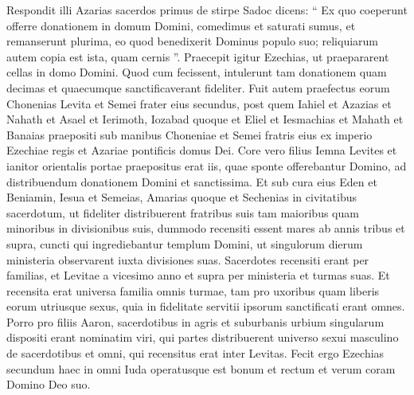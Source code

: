 \begin{biblechapter}
\begin{biblechapter}
\begin{biblechapter}
\begin{biblechapter}
\begin{biblechapter}
\begin{biblechapter}
\begin{biblechapter}
\begin{biblechapter}
\begin{biblechapter}
\begin{biblechapter}
\begin{biblechapter}
\begin{biblechapter}
\begin{biblechapter}
\begin{biblechapter}
\begin{biblechapter}
\begin{biblechapter}
\begin{biblechapter}
\begin{biblechapter}
\begin{biblechapter}
\begin{biblechapter}
\begin{biblechapter}
\begin{biblechapter}
\begin{biblechapter}
\begin{biblechapter}
\begin{biblechapter}
\begin{biblechapter}
\begin{biblechapter}
\begin{biblechapter}
\begin{biblechapter}
\begin{biblechapter}
\begin{biblechapter}
\verse Respondit illi Azarias sacerdos primus de stirpe Sadoc dicens: “ Ex quo coeperunt offerre donationem in domum Domini, comedimus et saturati sumus, et remanserunt plurima, eo quod benedixerit Dominus populo suo; reliquiarum autem copia est ista, quam cernis ”.
 \verse Praecepit igitur Ezechias, ut praepararent cellas in domo Domini. Quod cum fecissent, 
\verse intulerunt tam donationem quam decimas et quaecumque sanctificaverant fideliter. Fuit autem praefectus eorum Chonenias Levita et Semei frater eius secundus, 
\verse post quem Iahiel et Azazias et Nahath et Asael et Ierimoth, Iozabad quoque et Eliel et Iesmachias et Mahath et Banaias praepositi sub manibus Choneniae et Semei fratris eius ex imperio Ezechiae regis et Azariae pontificis domus Dei.
 \verse Core vero filius Iemna Levites et ianitor orientalis portae praepositus erat iis, quae sponte offerebantur Domino, ad distribuendum donationem Domini et sanctissima. 
\verse Et sub cura eius Eden et Beniamin, Iesua et Semeias, Amarias quoque et Sechenias in civitatibus sacerdotum, ut fideliter distribuerent fratribus suis tam maioribus quam minoribus in divisionibus suis, 
\verse dummodo recensiti essent mares ab annis tribus et supra, cuncti qui ingrediebantur templum Domini, ut singulorum dierum ministeria observarent iuxta divisiones suas.
 \verse Sacerdotes recensiti erant per familias, et Levitae a vicesimo anno et supra per ministeria et turmas suas. 
\verse Et recensita erat universa familia omnis turmae, tam pro uxoribus quam liberis eorum utriusque sexus, quia in fidelitate servitii ipsorum sanctificati erant omnes. 
\verse Porro pro filiis Aaron, sacerdotibus in agris et suburbanis urbium singularum dispositi erant nominatim viri, qui partes distribuerent universo sexui masculino de sacerdotibus et omni, qui recensitus erat inter Levitas.
 \verse Fecit ergo Ezechias secundum haec in omni Iuda operatusque est bonum et rectum et verum coram Domino Deo suo. 

\end{biblechapter}
\end{biblechapter}
\end{biblechapter}
\end{biblechapter}
\end{biblechapter}
\end{biblechapter}
\end{biblechapter}
\end{biblechapter}
\end{biblechapter}
\end{biblechapter}
\end{biblechapter}
\end{biblechapter}
\end{biblechapter}
\end{biblechapter}
\end{biblechapter}
\end{biblechapter}
\end{biblechapter}
\end{biblechapter}
\end{biblechapter}
\end{biblechapter}
\end{biblechapter}
\end{biblechapter}
\end{biblechapter}
\end{biblechapter}
\end{biblechapter}
\end{biblechapter}
\end{biblechapter}
\end{biblechapter}
\end{biblechapter}
\end{biblechapter}
\end{biblechapter}
